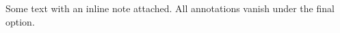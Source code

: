 \documentclass{article}
\begin{document}
Some text with an inline note attached.
All annotations vanish under the final option.
\end{document}
